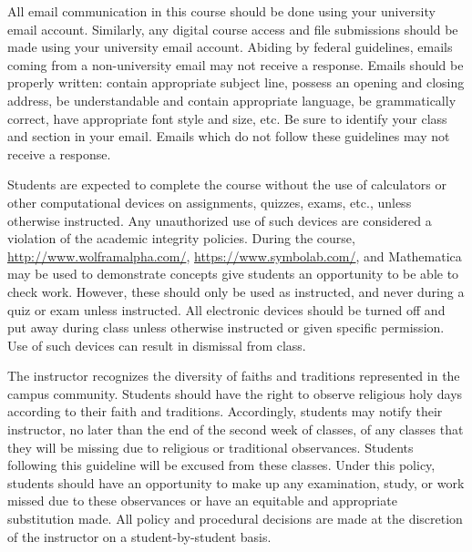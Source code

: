 \documentclass[11pt,letterpaper]{article}
\begin{document}
\newpage






All email communication in this course should be done using your university email account. Similarly, any digital course access and file submissions should be made using your university email account. Abiding by federal guidelines, emails coming from a non-university email may not receive a response. Emails should be properly written: contain appropriate subject line, possess an opening and closing address, be understandable and contain appropriate language, be grammatically correct, have appropriate font style and size, etc. Be sure to identify your class and section in your email. Emails which do not follow these guidelines may not receive a response. 
\sectionbreak




Students are expected to complete the course without the use of calculators or other computational devices on assignments, quizzes, exams, etc., unless otherwise instructed. Any unauthorized use of such devices are considered a violation of the academic integrity policies. During the course, \href{http://www.wolframalpha.com/}{http://www.wolframalpha.com/}, \href{https://www.symbolab.com/}{https://www.symbolab.com/}, and Mathematica may be used to demonstrate concepts give students an opportunity to be able to check work. However, these should only be used as instructed, and never during a quiz or exam unless instructed. All electronic devices should be turned off and put away during class unless otherwise instructed or given specific permission. Use of such devices can result in dismissal from class.
\sectionbreak




The instructor recognizes the diversity of faiths and traditions represented in the campus community. Students should have the right to observe religious holy days according to their faith and traditions. Accordingly, students may notify their instructor, no later than the end of the second week of classes, of any classes that they will be missing due to religious or traditional observances. Students following this guideline will be excused from these classes. Under this policy, students should have an opportunity to make up any examination, study, or work missed due to these observances or have an equitable and appropriate substitution made. All policy and procedural decisions are made at the discretion of the instructor on a student-by-student basis. 
\sectionbreak
\end{document}
